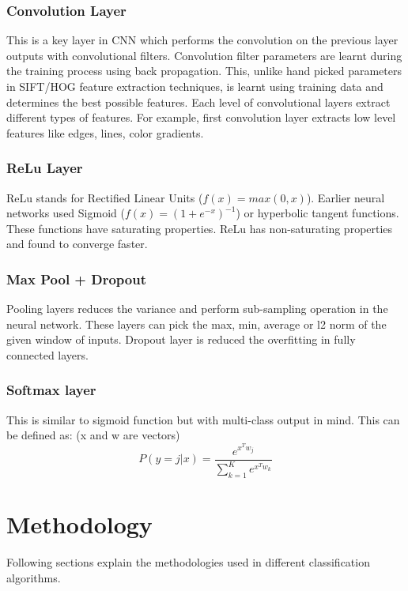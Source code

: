\documentclass[12pt]{article}
\begin{document}
\subsubsection*{Convolution Layer}
This is a key layer in CNN which performs the convolution on the previous layer outputs with convolutional filters. Convolution filter parameters are learnt during the training process using back propagation. This, unlike hand picked parameters in SIFT/HOG feature extraction techniques, is learnt using training data and determines the best possible features. Each level of convolutional layers extract different types of features. For example, first convolution layer extracts low level features like edges, lines, color gradients. 
\subsubsection*{ReLu Layer}
ReLu stands for Rectified Linear Units ($f(x)=max(0,x)$). Earlier neural networks used Sigmoid ($f(x) = (1+e^{-x})^{-1}$) or hyperbolic tangent functions. These functions have saturating  properties. ReLu has non-saturating properties and found to converge faster.
\subsubsection*{Max Pool + Dropout}
Pooling layers  reduces the variance and perform sub-sampling operation in the neural network. These layers can pick the max, min, average or l2 norm of the given window of inputs.
Dropout layer is reduced the overfitting in fully connected layers. 
\subsubsection*{Softmax layer}
This is similar to sigmoid function but with multi-class output in mind. This can be defined as: (x and w are vectors)
\[
P(y=j|x)=\frac{e^{x^Tw_j}}{\sum_{k=1}^{K}e^{x^Tw_k}}
\]

\section{Methodology}
Following sections explain the methodologies used in different classification algorithms.
\end{document}
